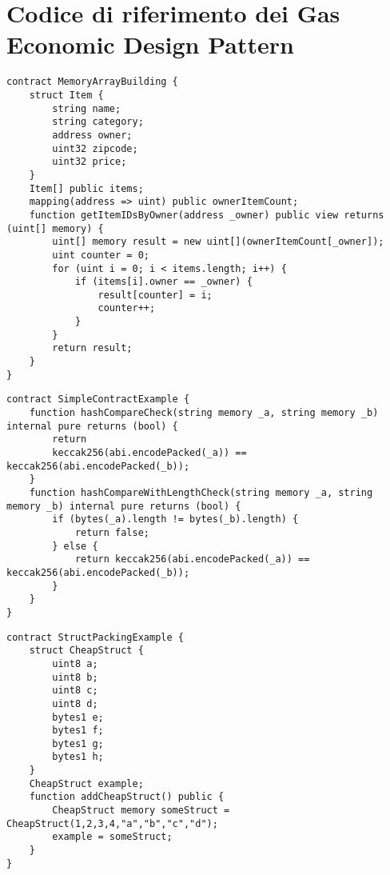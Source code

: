 {\section{Codice di riferimento dei Gas Economic Design Pattern}

{\label{appendix:memory_array_building}\begin{lstlisting}[language=Solidity, caption={Codice di riferimento per Memory Array Building}]
contract MemoryArrayBuilding {
	struct Item {
		string name;
		string category;
		address owner;
		uint32 zipcode;
		uint32 price;
	}
	Item[] public items;
	mapping(address => uint) public ownerItemCount;
	function getItemIDsByOwner(address _owner) public view returns (uint[] memory) {
		uint[] memory result = new uint[](ownerItemCount[_owner]);
		uint counter = 0;
		for (uint i = 0; i < items.length; i++) {
			if (items[i].owner == _owner) {
				result[counter] = i;
				counter++;
			}
		}
		return result;
	}
}
\end{lstlisting}}

{\label{appendix:string_equality_comparison}\begin{lstlisting}[language=Solidity, caption={Codice di riferimento per String Equality Comparison}]
contract SimpleContractExample {
	function hashCompareCheck(string memory _a, string memory _b) internal pure returns (bool) {
		return
		keccak256(abi.encodePacked(_a)) == keccak256(abi.encodePacked(_b));
	}
	function hashCompareWithLengthCheck(string memory _a, string memory _b) internal pure returns (bool) {
		if (bytes(_a).length != bytes(_b).length) {
			return false;
		} else {
			return keccak256(abi.encodePacked(_a)) == keccak256(abi.encodePacked(_b));
		}
	}
}
\end{lstlisting}}
\newpage
{\label{appendix:tight_variable_packing}\begin{lstlisting}[language=Solidity, caption={Codice di riferimento per Tight Variable Packing}]
contract StructPackingExample {
	struct CheapStruct {
		uint8 a;
		uint8 b;
		uint8 c;
		uint8 d;
		bytes1 e;
		bytes1 f;
		bytes1 g;
		bytes1 h;
	}
	CheapStruct example;
	function addCheapStruct() public {
		CheapStruct memory someStruct = CheapStruct(1,2,3,4,"a","b","c","d");
		example = someStruct;
	}
}
\end{lstlisting}}}
